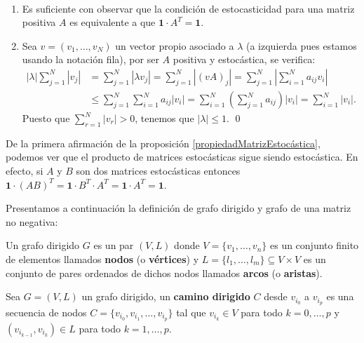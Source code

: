 \begin{proofs*}
\
\begin{enumerate}
    \item Es suficiente con observar que la condición de estocasticidad para una matriz positiva $A$ es equivalente a que $\mathbf{1}\cdot A^T=\mathbf{1}$.
    \item Sea $v=(v_1,\dots,v_N)$ un vector propio asociado a $\lambda$ (a izquierda pues estamos usando la notación fila), por ser $A$ positiva y estocástica, se verifica:
    \[
    \begin{aligned}
        \left|\lambda\right|\sum_{j=1}^N\left| v_j\right|&=\sum_{j=1}^N\left|\lambda v_j\right|= \sum_{j=1}^N\left|(vA)_j \right|  =\sum_{j=1}^N\left|\sum_{i=1}^N a_{ij}v_i\right|\\
        &\leq\sum_{j=1}^N\sum_{i=1}^N a_{ij}\left|v_i\right|=\sum_{i=1}^N\left( \sum_{j=1}^N a_{ij} \right) \left|v_i\right|=\sum_{i=1}^N\left|v_i\right|.    
    \end{aligned}
    \]
    Puesto que $\displaystyle\sum_{r=1}^N\left|v_r\right|>0$, tenemos que $\left|\lambda\right|\leq1$.    \qed
\end{enumerate}
\end{proofs*}

\begin{remark*}\label{productoEstocásticos}
De la primera afirmación de la proposición \ref{propiedadMatrizEstocástica}, podemos ver que el producto de matrices estocásticas sigue siendo estocástica. En efecto, si $A$ y $B$ son dos matrices estocásticas entonces $\mathbf{1}\cdot\left(AB\right)^T=\mathbf{1}\cdot B^T\cdot A^T=\mathbf{1}\cdot A^T=\mathbf{1}$.
\end{remark*}

Presentamos a continuación la definición de grafo dirigido y grafo de una matriz no negativa:
\begin{definition}
    Un grafo dirigido $G$ es un par $(V,L)$ donde $V=\{v_1,\dots,v_n\}$ es un conjunto finito de elementos llamados \textbf{nodos} (o \textbf{vértices}) y $L=\{l_1,\dots,l_m\}\subseteq V\times V$ es un conjunto de pares ordenados de dichos nodos llamados \textbf{arcos} (o \textbf{aristas}).
\end{definition}

\begin{definition}
    Sea $G=(V,L)$ un grafo dirigido, un \textbf{camino dirigido} $C$ desde $v_{i_0}$ a $v_{i_p}$ es una secuencia de nodos $C=\{v_{i_0},v_{i_1}, \dots, v_{i_p}\}$ tal que $v_{i_k}\in V$ para todo $k=0,\dots,p$ y $(v_{i_{k-1}}, v_{i_k})\in L$ para todo $k=1,\dots,p$. 
\end{definition}

